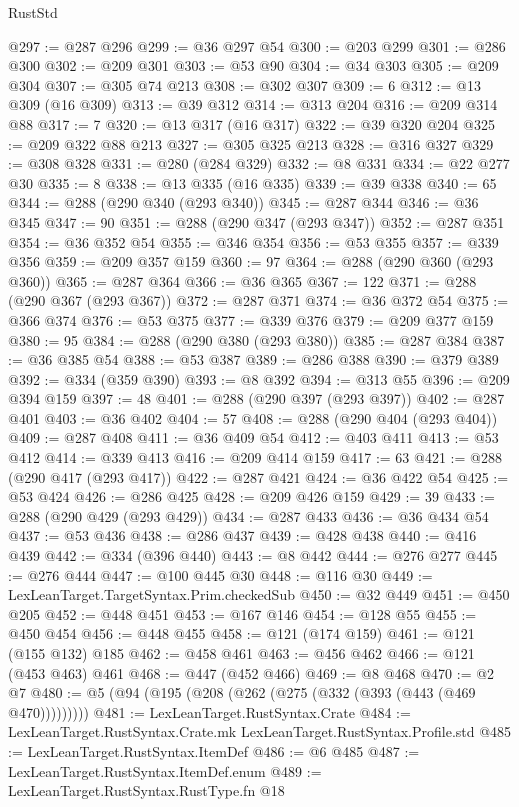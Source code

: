 \begin{lexlean}{RustStd}
\begin{coremodule}
@297 := @287 @296
@299 := @36 @297 @54
@300 := @203 @299
@301 := @286 @300
@302 := @209 @301
@303 := @53 @90
@304 := @34 @303
@305 := @209 @304
@307 := @305 @74 @213
@308 := @302 @307
@309 := 6
@312 := @13 @309 (@16 @309)
@313 := @39 @312
@314 := @313 @204
@316 := @209 @314 @88
@317 := 7
@320 := @13 @317 (@16 @317)
@322 := @39 @320 @204
@325 := @209 @322 @88 @213
@327 := @305 @325 @213
@328 := @316 @327
@329 := @308 @328
@331 := @280 (@284 @329)
@332 := @8 @331
@334 := @22 @277 @30
@335 := 8
@338 := @13 @335 (@16 @335)
@339 := @39 @338
@340 := 65
@344 := @288 (@290 @340 (@293 @340))
@345 := @287 @344
@346 := @36 @345
@347 := 90
@351 := @288 (@290 @347 (@293 @347))
@352 := @287 @351
@354 := @36 @352 @54
@355 := @346 @354
@356 := @53 @355
@357 := @339 @356
@359 := @209 @357 @159
@360 := 97
@364 := @288 (@290 @360 (@293 @360))
@365 := @287 @364
@366 := @36 @365
@367 := 122
@371 := @288 (@290 @367 (@293 @367))
@372 := @287 @371
@374 := @36 @372 @54
@375 := @366 @374
@376 := @53 @375
@377 := @339 @376
@379 := @209 @377 @159
@380 := 95
@384 := @288 (@290 @380 (@293 @380))
@385 := @287 @384
@387 := @36 @385 @54
@388 := @53 @387
@389 := @286 @388
@390 := @379 @389
@392 := @334 (@359 @390)
@393 := @8 @392
@394 := @313 @55
@396 := @209 @394 @159
@397 := 48
@401 := @288 (@290 @397 (@293 @397))
@402 := @287 @401
@403 := @36 @402
@404 := 57
@408 := @288 (@290 @404 (@293 @404))
@409 := @287 @408
@411 := @36 @409 @54
@412 := @403 @411
@413 := @53 @412
@414 := @339 @413
@416 := @209 @414 @159
@417 := 63
@421 := @288 (@290 @417 (@293 @417))
@422 := @287 @421
@424 := @36 @422 @54
@425 := @53 @424
@426 := @286 @425
@428 := @209 @426 @159
@429 := 39
@433 := @288 (@290 @429 (@293 @429))
@434 := @287 @433
@436 := @36 @434 @54
@437 := @53 @436
@438 := @286 @437
@439 := @428 @438
@440 := @416 @439
@442 := @334 (@396 @440)
@443 := @8 @442
@444 := @276 @277
@445 := @276 @444
@447 := @100 @445 @30
@448 := @116 @30
@449 := LexLeanTarget.TargetSyntax.Prim.checkedSub
@450 := @32 @449
@451 := @450 @205
@452 := @448 @451
@453 := @167 @146
@454 := @128 @55
@455 := @450 @454
@456 := @448 @455
@458 := @121 (@174 @159)
@461 := @121 (@155 @132) @185
@462 := @458 @461
@463 := @456 @462
@466 := @121 (@453 @463) @461
@468 := @447 (@452 @466)
@469 := @8 @468
@470 := @2 @7
@480 := @5 (@94 (@195 (@208 (@262 (@275 (@332 (@393 (@443 (@469 @470)))))))))
@481 := LexLeanTarget.RustSyntax.Crate
@484 := LexLeanTarget.RustSyntax.Crate.mk LexLeanTarget.RustSyntax.Profile.std
@485 := LexLeanTarget.RustSyntax.ItemDef
@486 := @6 @485
@487 := LexLeanTarget.RustSyntax.ItemDef.enum
@489 := LexLeanTarget.RustSyntax.RustType.fn @18

\end{coremodule}
\end{lexlean}
